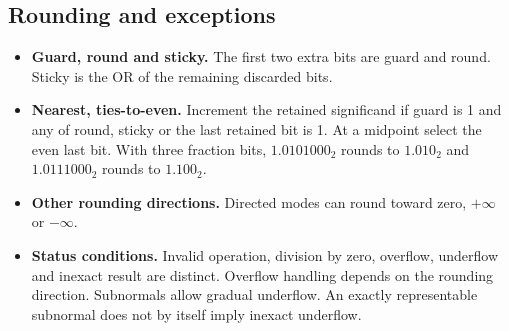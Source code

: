 \documentclass[12pt,a4paper]{article}
\begin{document}
\subsection{Rounding and exceptions}
\begin{itemize}[leftmargin=*,itemsep=3pt]
\item \textbf{Guard, round and sticky.} The first two extra bits are guard and round. Sticky is the OR of the remaining discarded bits.
\item \textbf{Nearest, ties-to-even.} Increment the retained significand if guard is 1 and any of round, sticky or the last retained bit is 1. At a midpoint select the even last bit. With three fraction bits, $1.0101000_2$ rounds to $1.010_2$ and $1.0111000_2$ rounds to $1.100_2$.
\item \textbf{Other rounding directions.} Directed modes can round toward zero, $+\infty$ or $-\infty$.
\item \textbf{Status conditions.} Invalid operation, division by zero, overflow, underflow and inexact result are distinct. Overflow handling depends on the rounding direction. Subnormals allow gradual underflow. An exactly representable subnormal does not by itself imply inexact underflow.
\end{itemize}
\end{document}
